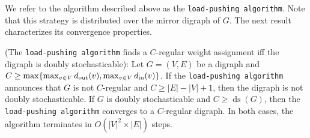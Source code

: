 \documentclass[final]{siamltex}
\begin{document}
We refer to the algorithm described above as the {\texttt{load-pushing algorithm}\xspace}. Note that
this strategy is distributed over the mirror digraph of $G$. The next
result characterizes its convergence properties.

\begin{theorem}{\mbox{}\textup{({The {\texttt{load-pushing algorithm}\xspace} finds a $ C $-regular
    weight assignment iff the digraph is doubly
    stochasticable}):}}\label{th:cregular}
  Let $ G=(V,E) $ be a digraph and $C \geq \max \{\max_{v \in V}
  {{{d}_{\textup{{out}}}}}(v), \max_{v \in V} {{{d}_{\textup{{in}}}}}(v)\}$.  If the {\texttt{load-pushing algorithm}\xspace} announces
  that $ G $ is not $ C $-regular and $C \geq |E|-|V|+1$, then the
  digraph is not doubly stochasticable.  If $ G $ is doubly
  stochasticable and $ C\geq {\operatorname{ds}}(G) $, then the {\texttt{load-pushing algorithm}\xspace} converges to
  a $ C $-regular digraph. In both cases, the algorithm terminates in
  $ O(|V|^2\times |E|)$ steps.
\end{theorem}
\end{document}
